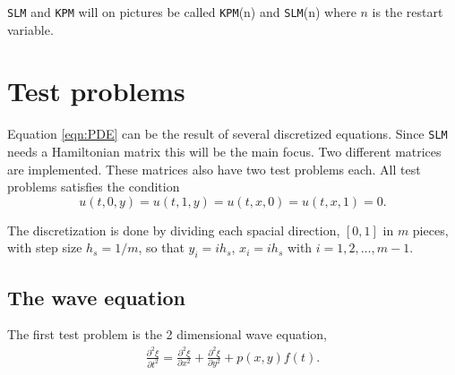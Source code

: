 \texttt{SLM} and \texttt{KPM} will on pictures be called \texttt{KPM}(n) and \texttt{SLM}(n) where $n$ is the restart variable.


\section{Test problems} %
\label{sec:testprob}

Equation \eqref{eqn:PDE} can be the result of several discretized equations. Since \texttt{SLM} needs a Hamiltonian matrix this will be the main focus. Two different matrices are implemented. These matrices also have two test problems each. All test problems satisfies the condition $$u(t,0,y) = u(t,1,y) = u(t,x,0) = u(t,x,1) = 0.$$ 

The discretization is done by dividing each spacial direction, $[0,1]$ in $m$ pieces, with step size $h_s = 1/m$, so that $y_i = i h_s$, $x_i = i h_s$ with $i = 1,2,\dots,m-1 $. 

\subsection{The wave equation} %

The first test problem is the 2 dimensional wave equation, 
\begin{equation}
\begin{aligned}
\frac{\partial^2 \xi}{\partial t^2} = \frac{\partial^2 \xi}{\partial x^2}+ \frac{\partial^2 \xi}{\partial y^2} + p(x,y)f(t).
\end{aligned}
\label{eqn:wave}
\end{equation}

